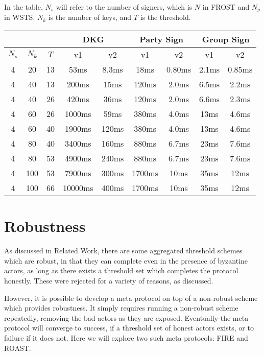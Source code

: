 \documentclass{article}
\begin{document}
In the table, $N_s$ will refer to the number of signers, which is $N$ in FROST and $N_p$ in WSTS.  $N_k$ is the number of keys, and $T$ is the threshold.

\begin{center}
  \begin{tabular}{ c|c|c|c|c|c|c|c|c } 
    \multicolumn{3}{c|}{} & \multicolumn{2}{|c|}{DKG}& \multicolumn{2}{|c|}{Party Sign} & \multicolumn{2}{|c}{Group Sign} \\
    \hline
    \hline
    $N_s$ & $N_k$ & $T$ & v1 & v2 & v1 & v2 & v1 & v2 \\ 
    \hline
    \hline
    4 & 20 & 13 & 53ms & 8.3ms & 18ms & 0.80ms & 2.1ms & 0.85ms \\ 
    4 & 40 & 13 & 200ms & 15ms & 120ms & 2.0ms & 6.5ms & 2.2ms \\ 
    4 & 40 & 26 & 420ms & 36ms & 120ms & 2.0ms & 6.6ms & 2.3ms \\ 
    4 & 60 & 26 & 1000ms & 59ms & 380ms & 4.0ms & 13ms & 4.6ms \\ 
    4 & 60 & 40 & 1900ms & 120ms & 380ms & 4.0ms & 13ms & 4.6ms \\ 
    4 & 80 & 40 & 3400ms & 160ms & 880ms & 6.7ms & 23ms & 7.6ms \\ 
    4 & 80 & 53 & 4900ms & 240ms & 880ms & 6.7ms & 23ms & 7.6ms \\ 
    4 & 100 & 53 & 7900ms & 300ms & 1700ms & 10ms & 35ms & 12ms \\ 
    4 & 100 & 66 & 10000ms & 400ms & 1700ms & 10ms & 35ms & 12ms \\ 
  \end{tabular}
\end{center}


\newpage
\onecolumn
\section{
  Robustness
}

As discussed in Related Work, there are some aggregated threshold schemes which are robust, in that they can complete even in the presence of byzantine actors, as long as there exists a threshold set which completes the protocol honestly.  These were rejected for a variety of reasons, as discussed.

However, it is possible to develop a meta protocol on top of a non-robust scheme which provides robustness.  It simply requires running a non-robust scheme repeatedly, removing the bad actors as they are exposed.  Eventually the meta protocol will converge to success, if a threshold set of honest actors exists, or to failure if it does not.  Here we will explore two such meta protocols: FIRE and ROAST.
\end{document}

